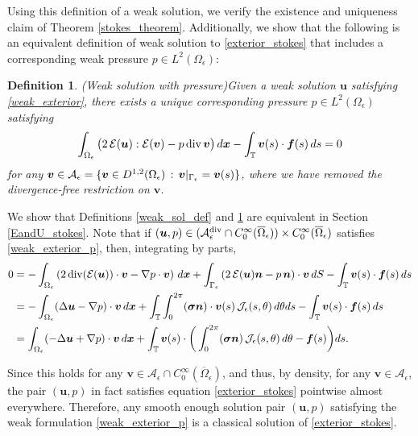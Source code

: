 \documentclass[11pt]{article}
\numberwithin{equation}{section}
\newcommand{\T}{\mathbb{T}}
\newcommand{\A}{\mathcal{A}}
\newcommand{\E}{\mathcal{E}}
\newcommand{\bu}{\bm{u}}
\newcommand{\bx}{\bm{x}}
\newcommand{\bv}{\bm{v}}
\newcommand{\ts}{\thinspace}
\newcommand{\dive}{{\rm{div}}}
\newtheorem{definition}[theorem]{Definition}
\theoremstyle{definition}
\begin{document}
Using this definition of a weak solution, we verify the existence and uniqueness claim of Theorem \ref{stokes_theorem}. Additionally, we show that the following is an equivalent definition of weak solution to \eqref{exterior_stokes} that includes a corresponding weak pressure $p\in L^2(\Omega_{\epsilon})$: 
\begin{definition}{\emph{(Weak solution with pressure)}}\label{pressure_exist}
Given a weak solution $\bu$ satisfying \eqref{weak_exterior}, there exists a unique corresponding pressure $p\in L^2(\Omega_{\epsilon})$ satisfying
\begin{equation}\label{weak_exterior_p}
 \int_{\Omega_{\epsilon}}\big(2 \ts\E(\bu):\E(\bv) - p\ts\dive\ts \bv\big) \ts d\bx - \int_{\T} \bv(s)\cdot{\bm f}(s) \ts ds = 0
\end{equation}
for any $\bv\in \A_{\epsilon}= \{\bv\in D^{1,2}(\Omega_{\epsilon}) \ts : \ts \bv|_{\Gamma_{\epsilon}}=\bv(s) \}$, where we have removed the divergence-free restriction on $\bv$. 
\end{definition}
We show that Definitions \ref{weak_sol_def} and \ref{pressure_exist} are equivalent in Section \ref{EandU_stokes}. Note that if $(\bu,p)\in (\A_{\epsilon}^{\dive}\cap C_0^{\infty}(\overline\Omega_{\epsilon}))\times C_0^{\infty}(\overline\Omega_{\epsilon})$ satisfies \eqref{weak_exterior_p}, then, integrating by parts, 
\begin{align*}
 0 &= -\int_{\Omega_{\epsilon}}\left(2\ts\dive(\E(\bu))\cdot \bv - \nabla p\cdot \bv\right) \ts d\bx + \int_{\Gamma_{\epsilon}}\left(2\ts \E(\bu){\bm n} - p\ts{\bm n}\right)\cdot \bv \ts dS  - \int_{\T} \bv(s)\cdot{\bm f}(s) \ts ds \\
 &= -\int_{\Omega_{\epsilon}} (\Delta\bu-\nabla p) \cdot\bv \ts d\bx + \int_{\T}\int_0^{2\pi}(\bm{\sigma}{\bm n})\cdot \bv(s) \ts \mathcal{J}_{\epsilon}(s,\theta)\ts d\theta ds  - \int_{\T} \bv(s)\cdot{\bm f}(s) \ts ds \\
 &= \int_{\Omega_{\epsilon}} (-\Delta\bu+\nabla p) \cdot\bv \ts d\bx + \int_{\T}\bv(s)\cdot\bigg(\int_0^{2\pi}(\bm{\sigma}{\bm n}) \ts \mathcal{J}_{\epsilon}(s,\theta)\ts d\theta - {\bm f}(s)\bigg) ds.
\end{align*}

Since this holds for any $\bv\in \A_{\epsilon}\cap C^\infty_0(\overline \Omega_\epsilon)$, and thus, by density, for any $\bv\in  \A_{\epsilon}$, the pair $(\bu,p)$ in fact satisfies equation \eqref{exterior_stokes} pointwise almost everywhere. Therefore, any smooth enough solution pair $(\bu,p)$ satisfying the weak formulation \ref{weak_exterior_p} is a classical solution of \eqref{exterior_stokes}. \\
\end{document}
